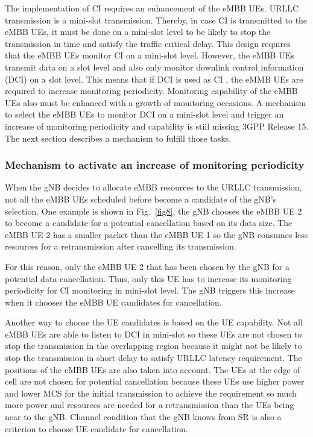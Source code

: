 \documentclass{ieeeaccess}
\begin{document}
The implementation of CI requires an enhancement of the eMBB UEs. URLLC transmission is a mini-slot transmission. Thereby, in case CI is transmitted to the eMBB UEs, it must be done on a mini-slot level to be likely to stop the transmission in time and satisfy the traffic critical delay. This design requires that the eMBB UEs monitor CI on a mini-slot level. However, the eMBB UEs transmit data on a slot level and also only monitor downlink control information (DCI) on a slot level. This means that if DCI is used as CI \cite{ref20}, the eMMB UEs are required to increase monitoring periodicity. Monitoring capability of the eMBB UEs also must be enhanced with a growth of monitoring occasions. A mechanism to select the eMBB UEs to monitor DCI on a mini-slot level and trigger an increase of monitoring periodicity and capability is still missing 3GPP Release 15. The next section describes a mechanism to fulfill those tasks. 

\subsubsection{Mechanism to activate an increase of monitoring periodicity}
When the gNB decides to allocate eMBB resources to the URLLC transmission, not all the eMBB UEs scheduled before become a candidate of the gNB's selection. One example is shown in Fig.~\ref{fig8}, the gNB chooses the eMBB UE 2 to become a candidate for a potential cancellation based on its data size. The eMBB UE 2 has a smaller packet than the eMBB UE 1 so the gNB consumes less resources for a retransmission after cancelling its transmission. 

For this reason, only the eMBB UE 2 that has been chosen by the gNB for a potential data cancellation. Thus, only this UE has to increase its monitoring periodicity for CI monitoring in mini-slot level. The gNB triggers this increase when it chooses the eMBB UE candidates for cancellation.

Another way to choose the UE candidates is based on the UE capability. Not all eMBB UEs are able to listen to DCI in mini-slot so these UEs are not chosen to stop the transmission in the overlapping region because it might not be likely to stop the transmission in short delay to satisfy URLLC latency requirement.
The positions of the eMBB UEs are also taken into account. The UEs at the edge of cell are not chosen for potential cancellation because these UEs use higher power and lower MCS for the initial transmission to achieve the requirement so much more power and resources are needed for a retransmission than the UEs being near to the gNB. Channel condition that the gNB knows from SR is also a criterion to choose UE candidate for cancellation.
\end{document}
